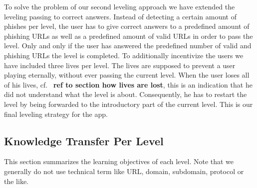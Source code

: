 \begin{description}[marginleft=0cm]
	\item[Leveling Based on Correct Answers] To solve the problem of our second leveling approach we have extended the leveling passing to correct answers. Instead of detecting a certain amount of phishes per level, the user has to give correct answers to a predefined amount of phishing URLs as well as a predefined amount of valid URLs in order to pass the level. Only and only if the user has answered the predefined number of valid and phishing URLs the level is completed. To additionally incentivize the users we have included three lives per level. The lives are supposed to prevent a user playing eternally, without ever passing the current level. When the user loses all of his lives, cf. ~\textbf{ref to section how lives are lost}, this is an indication that he did not understand what the level is about. Consequently, he has to restart the level by being forwarded to the introductory part of the current level. This is our final leveling strategy for the app.

\subsection{Knowledge Transfer Per Level}
This section summarizes the learning objectives of each level. Note that we generally do not use technical term like URL, domain, subdomain, protocol or the like.


\end{description}
